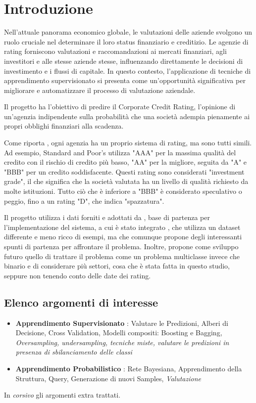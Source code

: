 \section{Introduzione}

\noindent Nell'attuale panorama economico globale, le valutazioni delle aziende svolgono un ruolo cruciale nel determinare il loro status finanziario e creditizio. Le agenzie di rating forniscono valutazioni e raccomandazioni ai mercati finanziari, agli investitori e alle stesse aziende stesse, influenzando direttamente le decisioni di investimento e i flussi di capitale. In questo contesto, l'applicazione di tecniche di apprendimento supervisionato si presenta come un'opportunità significativa per migliorare e automatizzare il processo di valutazione aziendale.

\noindent Il progetto ha l'obiettivo di predire il Corporate Credit Rating, l'opinione di un'agenzia indipendente sulla probabilità che una società adempia pienamente ai propri obblighi finanziari alla scadenza.

\noindent Come riporta \cite{investopediacorporatecredit}, ogni agenzia ha un proprio sistema di rating, ma sono tutti simili. Ad esempio, Standard and Poor's utilizza "AAA" per la massima qualità del credito con il rischio di credito più basso, "AA" per la migliore, seguita da "A" e "BBB" per un credito soddisfacente. Questi rating sono considerati "investment grade", il che significa che la società valutata ha un livello di qualità richiesto da molte istituzioni. Tutto ciò che è inferiore a "BBB" è considerato speculativo o peggio, fino a un rating "D", che indica "spazzatura".

\noindent Il progetto utilizza i dati forniti e adottati da \cite{makwana2022get}, base di partenza per l'implementazione del sistema, a cui è stato integrato \cite{nguyen2021multimodal}, che utilizza un dataset differente e meno ricco di esempi, ma che comunque propone degli interessanti spunti di partenza per affrontare il problema.
Inoltre, \cite{makwana2022get} propone come sviluppo futuro quello di trattare il problema come un problema multiclasse invece che binario e di considerare più settori, cosa che è stata fatta in questo studio, seppure non tenendo conto delle date dei rating.
\subsection{Elenco argomenti di interesse}

\begin{itemize}[label=-]
    \item \textbf{Apprendimento Supervisionato} \cite{PooleMackworth23Ch7}: Valutare le Predizioni, Alberi di Decisione, Cross Validation, Modelli compositi: Boosting e Bagging, \textit{Oversampling, undersampling, tecniche miste, valutare le predizioni in presenza di sbilanciamento delle classi}
    \item \textbf{Apprendimento Probabilistico} \cite{PooleMackworth23Ch10}: Rete Bayesiana, Apprendimento della Struttura, Query, Generazione di nuovi Samples, \textit{Valutazione}
\end{itemize}
\noindent In \textit{corsivo} gli argomenti extra trattati.